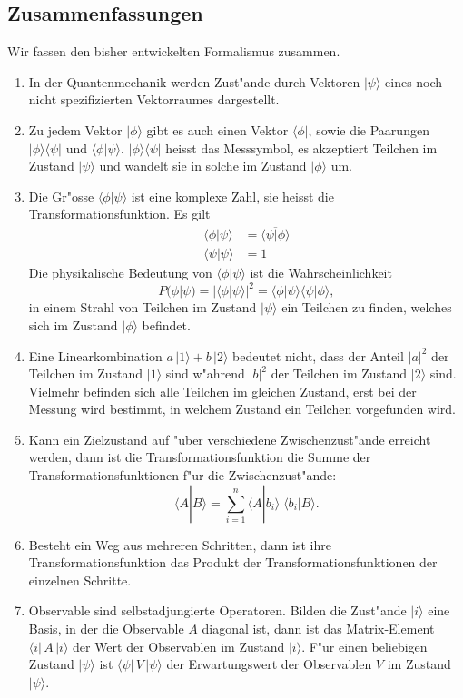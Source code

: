 \subsection{Zusammenfassungen}
Wir fassen den bisher entwickelten Formalismus zusammen.

\begin{enumerate}
\item
In der Quantenmechanik werden Zust"ande durch Vektoren $|\psi\rangle$
eines noch nicht spezifizierten Vektorraumes dargestellt.
\item
Zu jedem Vektor $|\phi\rangle$ gibt es auch einen Vektor $\langle \phi|$,
sowie die Paarungen
$|\phi\rangle\langle\psi|$
und
$\langle\phi|\psi\rangle$.
$|\phi\rangle\langle\psi|$ heisst das Messsymbol, es akzeptiert Teilchen im
Zustand $|\psi\rangle$ und wandelt sie in solche im Zustand $|\phi\rangle$
um.
\item
Die Gr"osse $\langle \phi|\psi\rangle$ ist eine komplexe Zahl, sie
heisst die Transformationsfunktion. Es gilt
\begin{align*}
\langle \phi|\psi\rangle
&=
\overline{
\langle \psi|\phi\rangle
}
\\
\langle\psi|\psi\rangle&=1
\end{align*}
Die physikalische Bedeutung von $\langle\phi|\psi\rangle$ ist die
Wahrscheinlichkeit
\[
P(\phi|\psi)=|\langle \phi|\psi\rangle|^2=
\langle\phi|\psi\rangle
\langle\psi|\phi\rangle,
\]
in einem Strahl von Teilchen im Zustand $|\psi\rangle$ ein Teilchen zu
finden, welches sich im Zustand $|\phi\rangle$ befindet.
\item
Eine Linearkombination $a\,|1\rangle + b\,|2\rangle$ bedeutet nicht,
dass der Anteil $|a|^2$ der Teilchen im Zustand $|1\rangle$ sind
w"ahrend $|b|^2$ der Teilchen im Zustand $|2\rangle$ sind.
Vielmehr befinden sich alle Teilchen im gleichen Zustand,
erst bei der Messung wird bestimmt, in welchem Zustand ein Teilchen
vorgefunden wird.
\item
Kann ein Zielzustand auf "uber verschiedene Zwischenzust"ande
erreicht werden, dann ist die Transformationsfunktion die Summe
der Transformationsfunktionen f"ur die Zwischenzust"ande:
\[
\langle A|B\rangle
=
\sum_{i=1}^n\langle A|b_i\rangle\;\langle b_i|B\rangle.
\]
\item
Besteht ein Weg aus mehreren Schritten, dann ist ihre Transformationsfunktion
das Produkt der Transformationsfunktionen der einzelnen Schritte.
\item 
Observable sind selbstadjungierte Operatoren.
Bilden die Zust"ande $|i\rangle$ eine Basis, in der die Observable $A$ 
diagonal ist, dann ist das Matrix-Element $\langle i|\,A\,|i\rangle$ der
Wert der Observablen im Zustand $|i\rangle$. F"ur einen beliebigen
Zustand $|\psi\rangle$ ist $\langle\psi|\,V\,|\psi\rangle$ der Erwartungswert
der Observablen $V$ im Zustand $|\psi\rangle$.
\end{enumerate}


